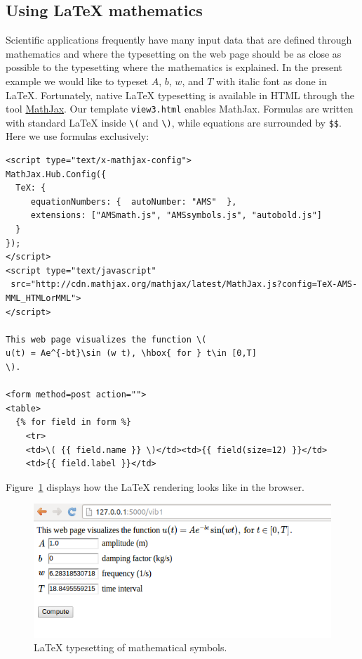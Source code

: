 \documentclass[%
oneside,                 %
final,                   %
10pt]{article}
\begin{document}
\subsection{Using {\LaTeX} mathematics}


Scientific applications frequently have many input data that are
defined through mathematics and where the typesetting on the
web page should be as close as possible to the typesetting where
the mathematics is explained. In the present example we would like
to typeset $A$, $b$, $w$, and $T$ with italic font as done
in {\LaTeX}. Fortunately, native {\LaTeX} typesetting is available in
HTML through the tool \href{{http://www.mathjax.org/}}{MathJax}.
Our template \Verb!view3.html! enables MathJax. Formulas are written
with standard {\LaTeX} inside \Verb!\(! and \Verb!\)!, while equations are surrounded
by \Verb!$$!. Here we use formulas exclusively:

\begin{Verbatim}[numbers=none,fontsize=\fontsize{9pt}{9pt},baselinestretch=0.85]
<script type="text/x-mathjax-config">
MathJax.Hub.Config({
  TeX: {
     equationNumbers: {  autoNumber: "AMS"  },
     extensions: ["AMSmath.js", "AMSsymbols.js", "autobold.js"]
  }
});
</script>
<script type="text/javascript"
 src="http://cdn.mathjax.org/mathjax/latest/MathJax.js?config=TeX-AMS-MML_HTMLorMML">
</script>

This web page visualizes the function \(
u(t) = Ae^{-bt}\sin (w t), \hbox{ for } t\in [0,T]
\).

<form method=post action="">
<table>
  {% for field in form %}
    <tr>
    <td>\( {{ field.name }} \)</td><td>{{ field(size=12) }}</td>
    <td>{{ field.label }}</td>
\end{Verbatim}
Figure~\ref{wf:vib1:flask:fig:latex} displays how the
{\LaTeX} rendering looks like in the browser.


\begin{figure}[ht]
  \centerline{\includegraphics[width=0.9\linewidth]{fig-web4sa/vib1_flask_latex.png}}
  \caption{
  {\LaTeX} typesetting of mathematical symbols. \label{wf:vib1:flask:fig:latex}
  }
\end{figure}
\end{document}
